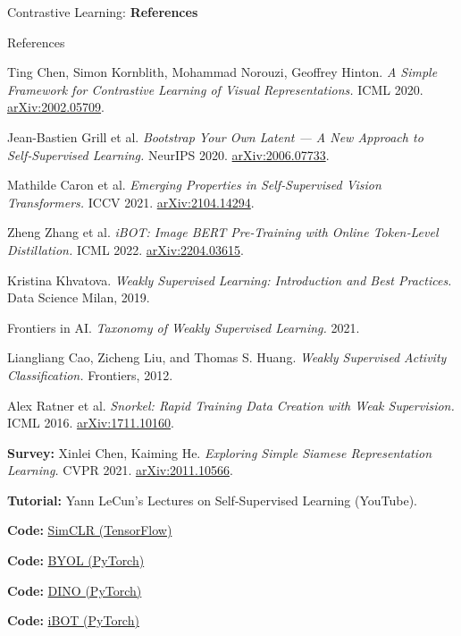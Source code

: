 \begin{frame}{}
    \LARGE Contrastive Learning: \textbf{References}
\end{frame}

\begin{frame}[allowframebreaks]{References}
\begin{thebibliography}{99}

Ting Chen, Simon Kornblith, Mohammad Norouzi, Geoffrey Hinton. \emph{A Simple Framework for Contrastive Learning of Visual Representations.} ICML 2020. \href{https://arxiv.org/abs/2002.05709}{arXiv:2002.05709}.

Jean-Bastien Grill et al. \emph{Bootstrap Your Own Latent — A New Approach to Self‑Supervised Learning.} NeurIPS 2020. \href{https://arxiv.org/abs/2006.07733}{arXiv:2006.07733}.

Mathilde Caron et al. \emph{Emerging Properties in Self‑Supervised Vision Transformers.} ICCV 2021. \href{https://arxiv.org/abs/2104.14294}{arXiv:2104.14294}.

Zheng Zhang et al. \emph{iBOT: Image BERT Pre‑Training with Online Token‑Level Distillation.} ICML 2022. \href{https://arxiv.org/abs/2204.03615}{arXiv:2204.03615}.

Kristina Khvatova. \emph{Weakly Supervised Learning: Introduction and Best Practices.} Data Science Milan, 2019.

Frontiers in AI. \emph{Taxonomy of Weakly Supervised Learning.} 2021.

Liangliang Cao, Zicheng Liu, and Thomas S. Huang. \emph{Weakly Supervised Activity Classification.} Frontiers, 2012.

Alex Ratner et al. \emph{Snorkel: Rapid Training Data Creation with Weak Supervision.} ICML 2016. \href{https://arxiv.org/abs/1711.10160}{arXiv:1711.10160}.

\textbf{Survey:} Xinlei Chen, Kaiming He. \emph{Exploring Simple Siamese Representation Learning.} CVPR 2021. \href{https://arxiv.org/abs/2011.10566}{arXiv:2011.10566}.

\textbf{Tutorial:} Yann LeCun’s Lectures on Self‑Supervised Learning (YouTube).

\textbf{Code:} \href{https://github.com/google-research/simclr}{SimCLR (TensorFlow)}

\textbf{Code:} \href{https://github.com/lucidrains/byol-pytorch}{BYOL (PyTorch)}

\textbf{Code:} \href{https://github.com/facebookresearch/dino}{DINO (PyTorch)}

\textbf{Code:} \href{https://github.com/bytedance/ibot}{iBOT (PyTorch)}

\end{thebibliography}
\end{frame}